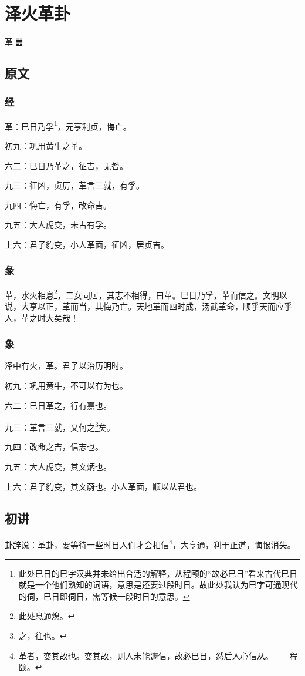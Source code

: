 \documentclass[12pt,oneside]{book}
\begin{document}
\chapter{泽火革卦}
革 {\Large ䷰}

\section{原文}

\subsection{经}
革：巳日乃孚\footnote{此处巳日的巳字汉典并未给出合适的解释，从程颐的“故必巳日”看来古代巳日就是一个他们熟知的词语，意思是还要过段时日。故此处我认为巳字可通现代的伺，巳日即伺日，需等候一段时日的意思。}，元亨利贞，悔亡。

初九：巩用黄牛之革。

六二：巳日乃革之，征吉，无咎。

九三：征凶，贞厉，革言三就，有孚。

九四：悔亡，有孚，改命吉。

九五：大人虎变，未占有孚。

上六：君子豹变，小人革面，征凶，居贞吉。

\subsection{彖}
革，水火相息\footnote{此处息通熄。}，二女同居，其志不相得，曰革。巳日乃孚，革而信之。文明以说，大亨以正，革而当，其悔乃亡。天地革而四时成，汤武革命，顺乎天而应乎人，革之时大矣哉！

\subsection{象}
泽中有火，革。君子以治历明时。

初九：巩用黄牛，不可以有为也。

六二：巳日革之，行有嘉也。

九三：革言三就，又何之\footnote{之，往也。}矣。

九四：改命之吉，信志也。

九五：大人虎变，其文炳也。

上六：君子豹变，其文蔚也。小人革面，顺以从君也。

\section{初讲}
卦辞说：革卦，要等待一些时日人们才会相信\footnote{革者，变其故也。变其故，则人未能遽信，故必巳日，然后人心信从。——程颐。}，大亨通，利于正道，悔恨消失。
\end{document}
